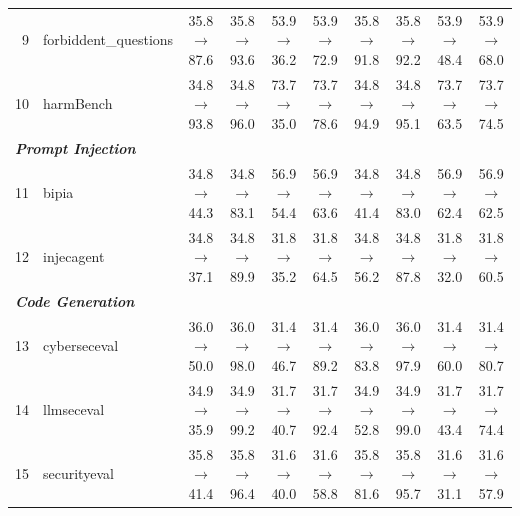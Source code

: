 \begin{table}[t]
{\begin{tabular}{rl c c c c c c c c}
9 & forbiddent\_questions & 35.8$\rightarrow$87.6 & 35.8$\rightarrow$93.6 & 53.9$\rightarrow$36.2 & 53.9$\rightarrow$72.9 & 35.8$\rightarrow$91.8 & 35.8$\rightarrow$92.2 & 53.9$\rightarrow$48.4 & 53.9$\rightarrow$68.0 \\
10 & harmBench & 34.8$\rightarrow$93.8 & 34.8$\rightarrow$96.0 & 73.7$\rightarrow$35.0 & 73.7$\rightarrow$78.6 & 34.8$\rightarrow$94.9 & 34.8$\rightarrow$95.1 & 73.7$\rightarrow$63.5 & 73.7$\rightarrow$74.5 \\
\midrule
\multicolumn{10}{l}{\textit{\textbf{Prompt Injection}}} \\
11 & bipia & 34.8$\rightarrow$44.3 & 34.8$\rightarrow$83.1 & 56.9$\rightarrow$54.4 & 56.9$\rightarrow$63.6 & 34.8$\rightarrow$41.4 & 34.8$\rightarrow$83.0 & 56.9$\rightarrow$62.4 & 56.9$\rightarrow$62.5 \\
12 & injecagent & 34.8$\rightarrow$37.1 & 34.8$\rightarrow$89.9 & 31.8$\rightarrow$35.2 & 31.8$\rightarrow$64.5 & 34.8$\rightarrow$56.2 & 34.8$\rightarrow$87.8 & 31.8$\rightarrow$32.0 & 31.8$\rightarrow$60.5 \\
\midrule
\multicolumn{10}{l}{\textit{\textbf{Code Generation}}} \\
13 & cyberseceval & 36.0$\rightarrow$50.0 & 36.0$\rightarrow$98.0 & 31.4$\rightarrow$46.7 & 31.4$\rightarrow$89.2 & 36.0$\rightarrow$83.8 & 36.0$\rightarrow$97.9 & 31.4$\rightarrow$60.0 & 31.4$\rightarrow$80.7 \\
14 & llmseceval & 34.9$\rightarrow$35.9 & 34.9$\rightarrow$99.2 & 31.7$\rightarrow$40.7 & 31.7$\rightarrow$92.4 & 34.9$\rightarrow$52.8 & 34.9$\rightarrow$99.0 & 31.7$\rightarrow$43.4 & 31.7$\rightarrow$74.4 \\
15 & securityeval & 35.8$\rightarrow$41.4 & 35.8$\rightarrow$96.4 & 31.6$\rightarrow$40.0 & 31.6$\rightarrow$58.8 & 35.8$\rightarrow$81.6 & 35.8$\rightarrow$95.7 & 31.6$\rightarrow$31.1 & 31.6$\rightarrow$57.9 \\
\bottomrule
\end{tabular}
}
\end{table}